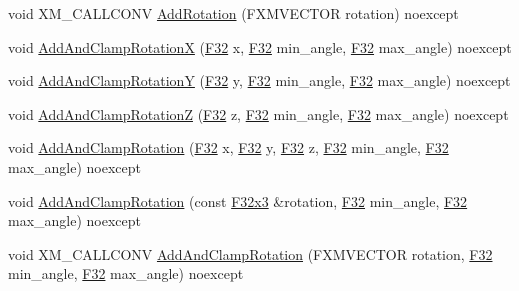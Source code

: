 \begin{DoxyCompactItemize}
\item 
void X\+M\+\_\+\+C\+A\+L\+L\+C\+O\+NV \mbox{\hyperlink{classmage_1_1_local_transform_a44da0f859b1687cd5846928bfc6d602e}{Add\+Rotation}} (F\+X\+M\+V\+E\+C\+T\+OR rotation) noexcept
\item 
void \mbox{\hyperlink{classmage_1_1_local_transform_ad706493a65d14c9decbeec3e52c25316}{Add\+And\+Clamp\+RotationX}} (\mbox{\hyperlink{namespacemage_aa97e833b45f06d60a0a9c4fc22ae02c0}{F32}} x, \mbox{\hyperlink{namespacemage_aa97e833b45f06d60a0a9c4fc22ae02c0}{F32}} min\+\_\+angle, \mbox{\hyperlink{namespacemage_aa97e833b45f06d60a0a9c4fc22ae02c0}{F32}} max\+\_\+angle) noexcept
\item 
void \mbox{\hyperlink{classmage_1_1_local_transform_a960e6f431f8962f7aee701c0af1dc9e0}{Add\+And\+Clamp\+RotationY}} (\mbox{\hyperlink{namespacemage_aa97e833b45f06d60a0a9c4fc22ae02c0}{F32}} y, \mbox{\hyperlink{namespacemage_aa97e833b45f06d60a0a9c4fc22ae02c0}{F32}} min\+\_\+angle, \mbox{\hyperlink{namespacemage_aa97e833b45f06d60a0a9c4fc22ae02c0}{F32}} max\+\_\+angle) noexcept
\item 
void \mbox{\hyperlink{classmage_1_1_local_transform_a324c338aa8a85a74145e5641f9c65c96}{Add\+And\+Clamp\+RotationZ}} (\mbox{\hyperlink{namespacemage_aa97e833b45f06d60a0a9c4fc22ae02c0}{F32}} z, \mbox{\hyperlink{namespacemage_aa97e833b45f06d60a0a9c4fc22ae02c0}{F32}} min\+\_\+angle, \mbox{\hyperlink{namespacemage_aa97e833b45f06d60a0a9c4fc22ae02c0}{F32}} max\+\_\+angle) noexcept
\item 
void \mbox{\hyperlink{classmage_1_1_local_transform_aa5c60513e379baae81f79cea835d1896}{Add\+And\+Clamp\+Rotation}} (\mbox{\hyperlink{namespacemage_aa97e833b45f06d60a0a9c4fc22ae02c0}{F32}} x, \mbox{\hyperlink{namespacemage_aa97e833b45f06d60a0a9c4fc22ae02c0}{F32}} y, \mbox{\hyperlink{namespacemage_aa97e833b45f06d60a0a9c4fc22ae02c0}{F32}} z, \mbox{\hyperlink{namespacemage_aa97e833b45f06d60a0a9c4fc22ae02c0}{F32}} min\+\_\+angle, \mbox{\hyperlink{namespacemage_aa97e833b45f06d60a0a9c4fc22ae02c0}{F32}} max\+\_\+angle) noexcept
\item 
void \mbox{\hyperlink{classmage_1_1_local_transform_aa6b68f4b531aa34113b8df652c0245d8}{Add\+And\+Clamp\+Rotation}} (const \mbox{\hyperlink{namespacemage_a1e3c7a882af461f161caa1cbddaf1fa2}{F32x3}} \&rotation, \mbox{\hyperlink{namespacemage_aa97e833b45f06d60a0a9c4fc22ae02c0}{F32}} min\+\_\+angle, \mbox{\hyperlink{namespacemage_aa97e833b45f06d60a0a9c4fc22ae02c0}{F32}} max\+\_\+angle) noexcept
\item 
void X\+M\+\_\+\+C\+A\+L\+L\+C\+O\+NV \mbox{\hyperlink{classmage_1_1_local_transform_a00559d5316893be21c67d039a55d6d7f}{Add\+And\+Clamp\+Rotation}} (F\+X\+M\+V\+E\+C\+T\+OR rotation, \mbox{\hyperlink{namespacemage_aa97e833b45f06d60a0a9c4fc22ae02c0}{F32}} min\+\_\+angle, \mbox{\hyperlink{namespacemage_aa97e833b45f06d60a0a9c4fc22ae02c0}{F32}} max\+\_\+angle) noexcept

\end{DoxyCompactItemize}
